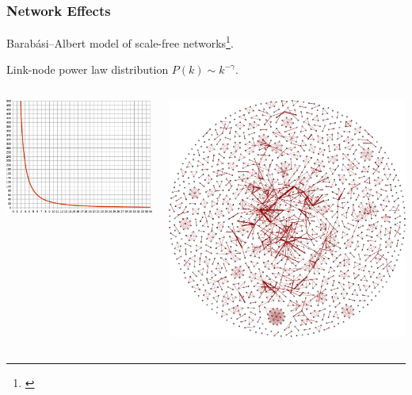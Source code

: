 \documentclass[handout, notes=hide]{beamer}
\newcommand{\prescite}[1]{\footnote{\cite{#1}}}
\begin{document}
\begin{frame}
\frametitle{Network Effects}
Barab\'asi--Albert model of scale-free networks\prescite{barabasi1999, albert2000}.

Link-node power law distribution $P(k) \sim k^{-\gamma}$.
\begin{columns}[b]
\begin{column}[c]{0.5\textwidth}
\includegraphics[width=\textwidth]{powerlaw}
\end{column}
\begin{column}[c]{0.45\textwidth}
\includegraphics[width=\textwidth]{netscience}
\end{column}
\end{columns}
\end{frame}
\end{document}
